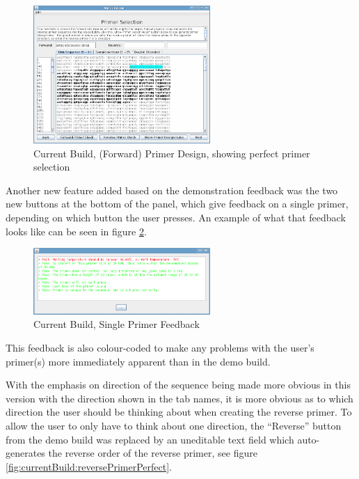 \begin{figure}[h]
  \begin{center}
    \includegraphics[width=0.6\textwidth]{./images/currentBuild/forwardPerfectPrimer.png}
    \caption{
      \label{fig:currentBuild:forwardPerfectPrimer}
      Current Build, (Forward) Primer Design, showing perfect primer selection
    }
  \end{center}
\end{figure}

Another new feature added based on the demonstration feedback was the
two new buttons at the bottom of the panel, which give feedback on a
single primer, depending on which button the user presses.
An example of what that feedback looks like can be seen in figure
\ref{fig:currentBuild:primerEvalRed}.

\begin{figure}[h]
  \begin{center}
    \includegraphics[width=0.6\textwidth]{./images/currentBuild/primerEvalRed.png}
    \caption{
      \label{fig:currentBuild:primerEvalRed}
      Current Build, Single Primer Feedback
    }
  \end{center}
\end{figure}

This feedback is also colour-coded to make any problems with the
user's primer(s) more immediately apparent than in the demo build.

With the emphasis on direction of the sequence being made more obvious
in this version with the direction shown in the tab names, it is more
obvious as to which direction the user should be thinking about when
creating the reverse primer.
To allow the user to only have to think about one direction, the
``Reverse'' button from the demo build was replaced by an uneditable
text field which auto-generates the reverse order of the reverse
primer, see figure \ref{fig:currentBuild:reversePrimerPerfect}.

